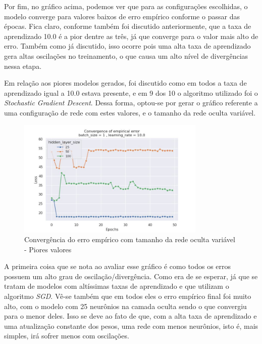 \documentclass{article}
\begin{document}
Por fim, no gráfico acima, podemos ver que para as configurações escolhidas, o modelo converge para valores baixos de erro empírico conforme o passar das épocas.
Fica claro, conforme também foi discutido anteriormente, que a taxa de aprendizado 10.0 é a pior dentre as três, já que converge para o valor mais alto de erro. Também
como já discutido, isso ocorre pois uma alta taxa de aprendizado gera altas oscilações no treinamento, o que causa um alto nível de divergências nessa etapa.

Em relação aos piores modelos gerados, foi discutido como em todos a taxa de aprendizado igual a 10.0 estava presente, e em 9 dos 10 o algoritmo utilizado foi o \textit{Stochastic Gradient Descent}.
Dessa forma, optou-se por gerar o gráfico referente a uma configuração de rede com estes valores, e o tamanho da rede oculta variável.

\begin{figure}[H]
    \centering
    \includegraphics[width=0.8\textwidth]{images/empirical_error/hidden_layer_size_not_fixed_bad.jpg}
    \caption{Convergência do erro empírico com tamanho da rede oculta variável - Piores valores}
\end{figure}

A primeira coisa que se nota ao avaliar esse gráfico é como todos os erros possuem um alto grau de oscilação/divergência. Como era de se
esperar, já que se tratam de modelos com altíssimas taxas de aprendizado e que utilizam o algoritmo \textit{SGD}. Vê-se também
que em todos eles o erro empírico final foi muito alto, com o modelo com 25 neurônios na camada oculta sendo o que convergiu
para o menor deles. Isso se deve ao fato de que, com a alta taxa de aprendizado e uma atualização constante dos pesos, uma rede
com menos neurônios, isto é, mais simples, irá sofrer menos com oscilações.
\end{document}

